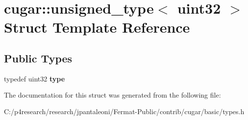 \hypertarget{structcugar_1_1unsigned__type_3_01uint32_01_4}{}\section{cugar\+:\+:unsigned\+\_\+type$<$ uint32 $>$ Struct Template Reference}
\label{structcugar_1_1unsigned__type_3_01uint32_01_4}
\subsection*{Public Types}
\begin{DoxyCompactItemize}
\item 
\mbox{\label{structcugar_1_1unsigned__type_3_01uint32_01_4_a864408a7daa3ff80354793fbf0cc302b}} 
typedef uint32 {\bfseries type}
\end{DoxyCompactItemize}


The documentation for this struct was generated from the following file\+:\begin{DoxyCompactItemize}
\item 
C\+:/p4research/research/jpantaleoni/\+Fermat-\/\+Public/contrib/cugar/basic/types.\+h\end{DoxyCompactItemize}
